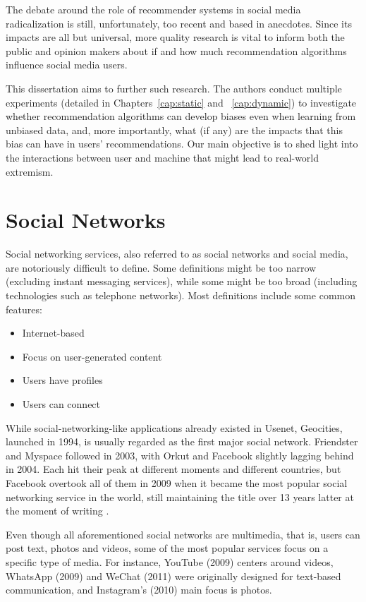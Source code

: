 The debate around the role of recommender systems in social media radicalization
is still, unfortunately, too recent and based in anecdotes. Since its impacts
are all but universal, more quality research is vital to inform both the public
and opinion makers about if and how much recommendation algorithms influence
social media users.

This dissertation aims to further such research. The authors conduct multiple
experiments (detailed in Chapters~\ref{cap:static} and ~\ref{cap:dynamic}) to
investigate whether recommendation algorithms can develop biases even when
learning from unbiased data, and, more importantly, what (if any) are the
impacts that this bias can have in users' recommendations. Our main objective is
to shed light into the interactions between user and machine that might lead to
real-world extremism.

\section{Social Networks}
\label{sec:social_networks}

Social networking services, also referred to as social networks and social
media, are notoriously difficult to define. Some definitions might be too narrow
(excluding instant messaging services), while some might be too broad (including
technologies such as telephone networks). Most definitions
\citep{boyd_social_2007} include some common features:

\begin{itemize}
  \item Internet-based
  \item Focus on user-generated content
  \item Users have profiles
  \item Users can connect
\end{itemize}

While social-networking-like applications already existed in Usenet, Geocities,
launched in 1994, is usually regarded as the first major social network.
Friendster and Myspace followed in 2003, with Orkut and Facebook slightly
lagging behind in 2004. Each hit their peak at different moments and different
countries, but Facebook overtook all of them in 2009 when it became the most
popular social networking service in the world, still maintaining the title over
13 years latter at the moment of writing \citep{noauthor_biggest_nodate}.

Even though all aforementioned social networks are multimedia, that is, users
can post text, photos and videos, some of the most popular services focus on a
specific type of media. For instance, YouTube (2009) centers around videos,
WhatsApp (2009) and WeChat (2011) were originally designed for text-based
communication, and Instagram's (2010) main focus is photos.

